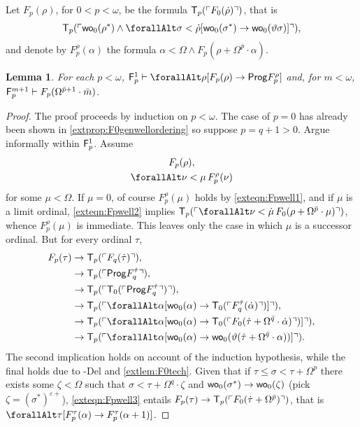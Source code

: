 \documentclass[UKenglish,cleveref,DIV=12]{scrartcl}
\let\forall\forallAlt
\newtheorem{lemma}{Lemma}
\theoremstyle{definition}
\theoremstyle{definition}
\begin{document}
Let $F_p(\rho)$, for $0<p<\omega$, be the formula $\mathsf{T}_p(\ulcorner{F_0(\dot\rho)}\urcorner)$, that is
\begin{align*}
 \T_{p}(\gn{\wo_0(\rho^*)\land\forall\sigma<\dot\rho [\wo_0(\sigma^*)\rightarrow\wo_0(\vartheta\sigma)]}),
\end{align*}
and denote by $F_p^\rho(\alpha)$ the formula $\alpha<\Omega\land F_p(\rho+\Omega^{\bar p}\cdot\alpha)$.
\begin{lemma}\label{extlem:Fpwellordering1}
 For each $p<\omega$, $\F_p^1\proves \forall\rho[F_p(\rho)\rightarrow\Prog F_p^{\rho}]$ and, for $m<\omega$, $\mathsf{F}_p^{m+1}\vdash F_p(\Omega^{\bar p+1}\cdot\bar m)$.
\end{lemma}
\begin{proof} The proof proceeds by induction on $p<\omega$. The case of $p=0$
has already been shown in \cref{extprop:F0genwellordering} so suppose $p=q+1>0$.
Argue informally within $\mathsf{F}_p^1$. Assume
\begin{gather}
 F_p(\rho),\label{exteqn:Fpwell1}\\
 \forall\nu<\mu\,F_p^\rho(\nu)\label{exteqn:Fpwell2}
\end{gather}
for some $\mu<\Omega$. If $\mu=0$, of course $F_p^\rho(\mu)$ holds by
\cref{exteqn:Fpwell1}, and if $\mu$ is a limit ordinal, \cref{exteqn:Fpwell2}
implies $\T_p(\gn{\forall\nu<\dot\mu\,F_0(\rho+\Omega^{\bar p}\cdot\mu)})$,
whence $F_p^\rho(\mu)$ is immediate. This leaves only the case in which $\mu$ is a
successor ordinal. But for every ordinal $\tau$,
\begin{align}\label{exteqn:Fpwell3}
\begin{split}
  F_p(\tau) &\rightarrow \T_p(\gn{F_q(\dot\tau)}), \\
	  &\rightarrow \T_p(\gn{\Prog F_q^{\dot\tau}}),\\
	  &\rightarrow \T_p(\gn{\T_0(\gn{\Prog F_q^{\dot\tau}})}),\\
	  &\rightarrow \T_p(\gn{\forall\alpha[\wo_0(\alpha)\rightarrow \T_0(\gn{F_q^{\dot\tau}(\dot\alpha)})]}),\\
	  &\rightarrow \T_p(\gn{\forall\alpha[\wo_0(\alpha)\rightarrow \T_0(\gn{F_0(\dot\tau+\Omega^{\bar q}\cdot\dot\alpha)})]}),\\
	  &\rightarrow \T_p(\gn{\forall\alpha[\wo_0(\alpha)\rightarrow\wo_0(\vartheta(\dot\tau+\Omega^{\bar q}\cdot\alpha))]}).
	  \end{split}
\end{align}
The second implication holds on account of the induction hypothesis, while the
final holds due to -Del and \cref{extlem:F0tech}. Given that if
$\tau\le\sigma<\tau+\Omega^{p}$ there exists
some $\zeta<\Omega$ such that $\sigma<\tau+\Omega^q\cdot\zeta$ and
$\mathsf{wo}_0(\sigma^*)\rightarrow\mathsf{wo}_0(\zeta)$ (pick
$\zeta=(\sigma^*)^{\varepsilon+}$), \cref{exteqn:Fpwell3}
entails $F_p(\tau)\rightarrow\mathsf{T}_p(\ulcorner{F_0(\dot\tau+\Omega^{\bar p})}\urcorner)$,
that is $\forall\tau[F_p^\tau(\alpha)\rightarrow F_p^\tau(\alpha+1)]$.


\end{proof}
\end{document}
